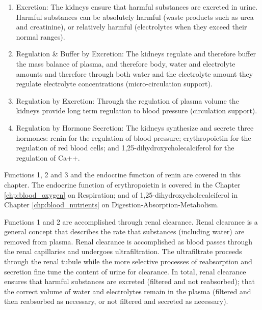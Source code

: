 \begin{enumerate}
    \item Excretion: The kidneys ensure that harmful substances are excreted in urine. Harmful substances can be absolutely harmful (waste products such as urea and creatinine), or relatively harmful (electrolytes when they exceed their normal ranges).
    \item Regulation \& Buffer by Excretion: The kidneys regulate and therefore buffer the mass balance of plasma, and therefore body, water and electrolyte amounts and therefore through both water and the electrolyte amount they regulate electrolyte concentrations (micro-circulation support).
    \item Regulation by Excretion: Through the regulation of plasma volume the kidneys provide long term regulation to blood pressure (circulation support).
    \item Regulation by Hormone Secretion: The kidneys synthesize and secrete three hormones: renin for the regulation of blood pressure; erythropoietin for the regulation of red blood cells; and 1,25-dihydroxycholecalciferol for the regulation of Ca++.
\end{enumerate}

Functions 1, 2 and 3 and the endocrine function of renin are covered in this chapter. The endocrine function of erythropoietin is covered in the Chapter \ref{chp:blood_oxygen} on Respiration; and of 1,25-dihydroxycholecalciferol in Chapter \ref{chp:blood_nutrients} on Digestion-Absorption-Metabolism.

Functions 1 and 2 are accomplished through renal clearance. Renal clearance is a general concept that describes the rate that substances (including water) are removed from plasma. Renal clearance is accomplished as blood passes through the renal capillaries and undergoes ultrafiltration. The ultrafiltrate proceeds through the renal tubule while the more selective processes of reabsorption and secretion fine tune the content of urine for clearance. In total, renal clearance ensures that harmful substances are excreted (filtered and not reabsorbed); that the correct volume of water and electrolytes remain in the plasma (filtered and then reabsorbed as necessary, or not filtered and secreted as necessary). 

